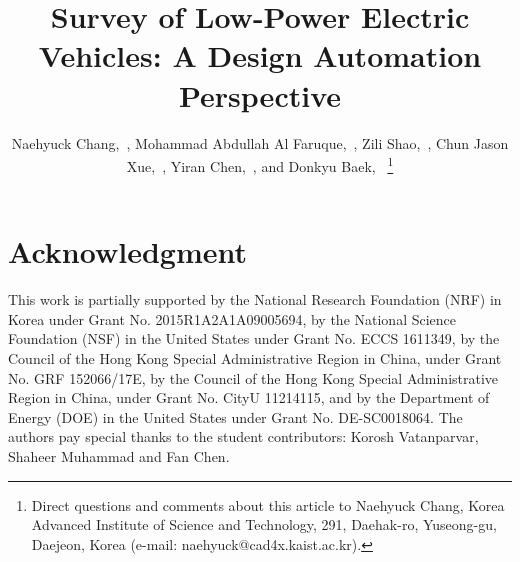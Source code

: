 \documentclass[journal]{IEEEtran}
\begin{document}
\title{Survey of Low-Power Electric Vehicles: A Design Automation Perspective}

\author{
	Naehyuck Chang,~,
	Mohammad Abdullah Al Faruque,~,
	Zili Shao,~,
	Chun Jason Xue,~,
	Yiran Chen,~, and
	Donkyu Baek,~
\thanks{Direct questions and comments about this article to Naehyuck Chang, Korea Advanced Institute of Science and Technology, 291, Daehak-ro, Yuseong-gu, Daejeon, Korea (e-mail: naehyuck@cad4x.kaist.ac.kr).}
}

\maketitle










\section*{Acknowledgment}
This work is partially supported by the National Research Foundation (NRF) in Korea under Grant No. 2015R1A2A1A09005694, by the National Science Foundation (NSF) in the United States under Grant No. ECCS 1611349, by the Council of the Hong Kong Special Administrative Region in China, under Grant No. GRF 152066/17E, by the Council of the Hong Kong Special Administrative Region in China, under Grant No. CityU 11214115, and by the Department of Energy (DOE) in the United States under Grant No. DE-SC0018064. The authors pay special thanks to the student contributors: Korosh Vatanparvar, Shaheer Muhammad and Fan Chen. 

    
\end{document}
